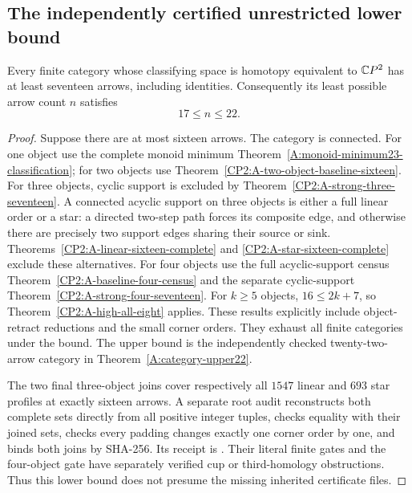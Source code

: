 \subsection{The independently certified unrestricted lower bound}
\begin{theorem}
\label{CP2:A-global-lower-seventeen}
Every finite category whose classifying space is homotopy equivalent
to $\mathbb{C}P^2$ has at least seventeen arrows, including identities.
Consequently its least possible arrow count $n$ satisfies
\[
 17\le n\le22.
\]
\end{theorem}
\begin{proof}
Suppose there are at most sixteen arrows. The category is connected.
For one object use the complete monoid minimum
Theorem~\ref{A:monoid-minimum23-classification}; for two objects use
Theorem~\ref{CP2:A-two-object-baseline-sixteen}.
For three objects, cyclic support is excluded by
Theorem~\ref{CP2:A-strong-three-seventeen}. A connected acyclic
support on three objects is either a full linear order or a star:
a directed two-step path forces its composite edge, and otherwise
there are precisely two support edges sharing their source or sink.
Theorems~\ref{CP2:A-linear-sixteen-complete} and
\ref{CP2:A-star-sixteen-complete} exclude these alternatives.
For four objects use the full acyclic-support census
Theorem~\ref{CP2:A-baseline-four-census} and the separate cyclic-support
Theorem~\ref{CP2:A-strong-four-seventeen}.
For $k\ge5$ objects, $16\le2k+7$, so
Theorem~\ref{CP2:A-high-all-eight} applies. These results explicitly
include object-retract reductions and the small corner orders.
They exhaust all finite categories under the bound.
The upper bound is the independently checked twenty-two-arrow
category in Theorem~\ref{A:category-upper22}.

The two final three-object joins cover respectively all $1547$
linear and $693$ star profiles at exactly sixteen arrows.
A separate root audit reconstructs both complete sets directly
from all positive integer tuples, checks equality with their
joined sets, checks every padding changes exactly one corner
order by one, and binds both joins by SHA-256. Its receipt is
. Their literal
finite gates and the four-object gate have separately verified
cup or third-homology obstructions. Thus this lower bound does
not presume the missing inherited certificate files.
\end{proof}
